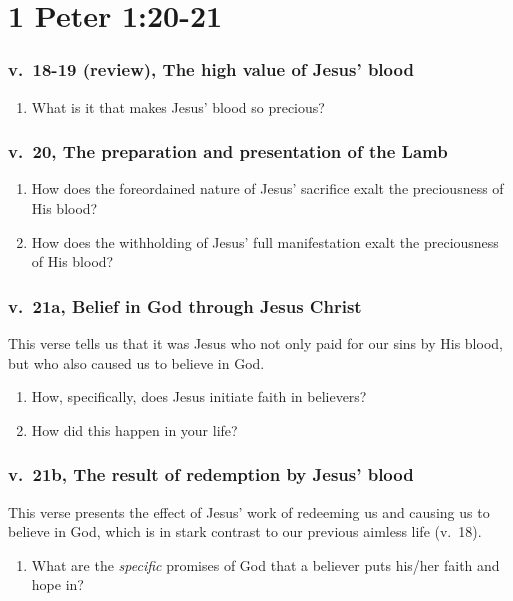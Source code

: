 \documentclass[12pt]{article}
\begin{document}
\part*{1 Peter 1:20-21}
\section*{v.~18-19 (review), The high value of Jesus' blood}
\begin{enumerate}
    \item What is it that makes Jesus' blood so precious?
\end{enumerate}

\section*{v.~20, The preparation and presentation of the Lamb}
\begin{enumerate}
    \item How does the foreordained nature of Jesus' sacrifice
        exalt the preciousness of His blood?
    \item How does the withholding of Jesus' full manifestation
        exalt the preciousness of His blood?
\end{enumerate}

\section*{v.~21a, Belief in God through Jesus Christ}
This verse tells us that it was Jesus who 
    not only paid for our sins by His blood,
    but who also caused us to believe in God.
\begin{enumerate}
    \item How, specifically, does Jesus initiate faith in believers?
    \item How did this happen in your life?
\end{enumerate}

\section*{v.~21b, The result of redemption by Jesus' blood}
This verse presents the effect of Jesus' work of 
    redeeming us and causing us to believe in God, 
    which is in stark contrast to our previous aimless life (v.~18).
\begin{enumerate}
    \item What are the \emph{specific} promises of God
        that a believer puts his/her faith and hope in?
\end{enumerate}
\end{document}
